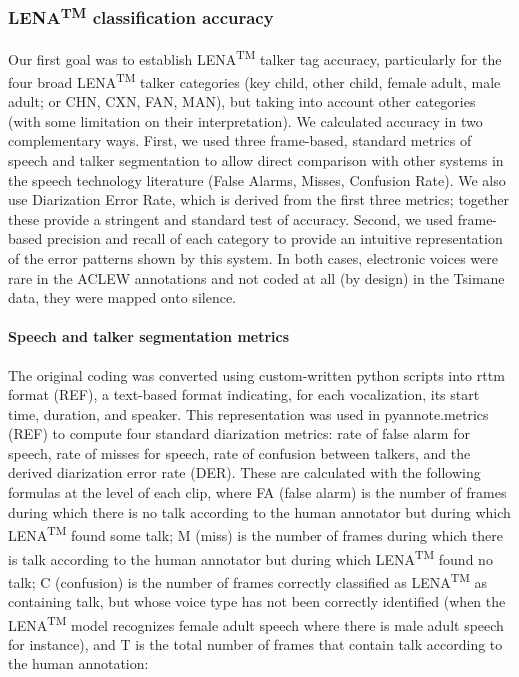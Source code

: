 \documentclass[english,floatsintext,man]{apa6}
\begin{document}
\subsubsection{\texorpdfstring{LENA\textsuperscript{TM} classification
accuracy}{LENATM classification accuracy}}\label{lenatm-classification-accuracy}

Our first goal was to establish LENA\textsuperscript{TM} talker tag
accuracy, particularly for the four broad LENA\textsuperscript{TM}
talker categories (key child, other child, female adult, male adult; or
CHN, CXN, FAN, MAN), but taking into account other categories (with some
limitation on their interpretation). We calculated accuracy in two
complementary ways. First, we used three frame-based, standard metrics
of speech and talker segmentation to allow direct comparison with other
systems in the speech technology literature (False Alarms, Misses,
Confusion Rate). We also use Diarization Error Rate, which is derived
from the first three metrics; together these provide a stringent and
standard test of accuracy. Second, we used frame-based precision and
recall of each category to provide an intuitive representation of the
error patterns shown by this system. In both cases, electronic voices
were rare in the ACLEW annotations and not coded at all (by design) in
the Tsimane data, they were mapped onto silence.

\paragraph{Speech and talker segmentation
metrics}\label{speech-and-talker-segmentation-metrics}

The original coding was converted using custom-written python scripts
into rttm format (REF), a text-based format indicating, for each
vocalization, its start time, duration, and speaker. This representation
was used in pyannote.metrics (REF) to compute four standard diarization
metrics: rate of false alarm for speech, rate of misses for speech, rate
of confusion between talkers, and the derived diarization error rate
(DER). These are calculated with the following formulas at the level of
each clip, where FA (false alarm) is the number of frames during which
there is no talk according to the human annotator but during which
LENA\textsuperscript{TM} found some talk; M (miss) is the number of
frames during which there is talk according to the human annotator but
during which LENA\textsuperscript{TM} found no talk; C (confusion) is
the number of frames correctly classified as LENA\textsuperscript{TM} as
containing talk, but whose voice type has not been correctly identified
(when the LENA\textsuperscript{TM} model recognizes female adult speech
where there is male adult speech for instance), and T is the total
number of frames that contain talk according to the human annotation:
\end{document}
